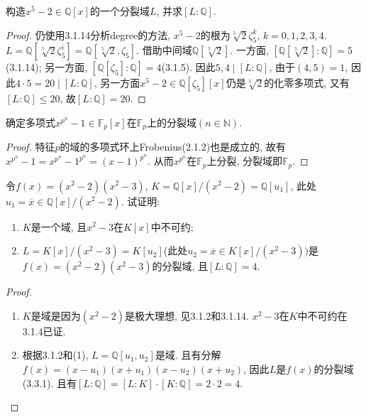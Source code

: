 \documentclass{../solutions-cn}
\begin{document}
\begin{exercise}[习题3.3.4]
    构造$x^5 - 2 \in \mathbb{Q}[x]$的一个分裂域$L$, 并求$[L:\mathbb{Q}]$.
\end{exercise}

\begin{proof}
    仍使用3.1.14分析degree的方法, $x^5 - 2$的根为$\sqrt[5]{2}\zeta_5^k$, $k = 0, 1, 2, 3, 4$. $L = \mathbb{Q}\left[\sqrt[5]{2}\zeta_5^i\right] = \mathbb{Q}\left[\sqrt[5]{2}, \zeta_5\right]$. 借助中间域$\mathbb{Q}[\sqrt[5]{2}]$. 一方面, $\left[\mathbb{Q}[\sqrt[5]{2}]:\mathbb{Q}\right] = 5$(3.1.14); 另一方面, $\left[\mathbb{Q}[\zeta_5]:\mathbb{Q}\right] = 4$(3.1.5). 因此$5, 4 \mid [L:\mathbb{Q}]$, 由于$(4,5) = 1$, 因此$4 \cdot 5 = 20 \mid [L:\mathbb{Q}]$, 另一方面$x^5 - 2 \in \mathbb{Q}[\zeta_5][x]$仍是$\sqrt[5]{2}$的化零多项式, 又有$[L:\mathbb{Q}] \leqslant 20$, 故$[L:\mathbb{Q}] = 20$.
\end{proof}

\begin{exercise}[习题3.3.5]
    确定多项式$x^{p^n} - 1 \in \mathbb{F}_p[x]$在$\mathbb{F}_p$上的分裂域$(n \in \mathbb{N})$.
\end{exercise}

\begin{proof}
    特征$p$的域的多项式环上Frobenius(2.1.2)也是成立的, 故有$x^{p^n} - 1 = x^{p^n} - 1^{p^n} = (x - 1)^{p^n}$. 从而$x^{p^n}$在$\mathbb{F}_p$上分裂, 分裂域即$\mathbb{F}_p$.
\end{proof}

\begin{exercise}[习题3.3.7]
    令$f(x) = (x^2 - 2)(x^2 - 3)$, $K = \mathbb{Q}[x]/(x^2 - 2) = \mathbb{Q}[u_1]$, 此处$u_1 = \overline{x} \in \mathbb{Q}[x]/(x^2 - 2)$. 试证明: 
    \begin{enumerate}[(1)]
        \item $K$是一个域, 且$x^2 - 3$在$K[x]$中不可约;
        \item $L = K[x]/(x^2 - 3) = K[u_2]$(此处$u_2 = \overline{x} \in K[x]/(x^2 - 3))$是$f(x) = (x^2 - 2)(x^2 - 3)$的分裂域, 且$[L:\mathbb{Q}] = 4$.
    \end{enumerate}
\end{exercise}

\begin{proof}
    \begin{enumerate}[(1)]
        \item $K$是域是因为$(x^2 - 2)$是极大理想, 见3.1.2和3.1.14. $x^2 - 3$在$K$中不可约在3.1.4已证.
        \item 根据3.1.2和(1), $L = \mathbb{Q}[u_1, u_2]$是域. 且有分解$f(x) = (x - u_1)(x + u_1)(x - u_2)(x + u_2)$, 因此$L$是$f(x)$的分裂域(3.3.1). 且有$[L:\mathbb{Q}] = [L:K] \cdot [K:\mathbb{Q}] = 2 \cdot 2 = 4$.
    \end{enumerate}
\end{proof}
\end{document}
